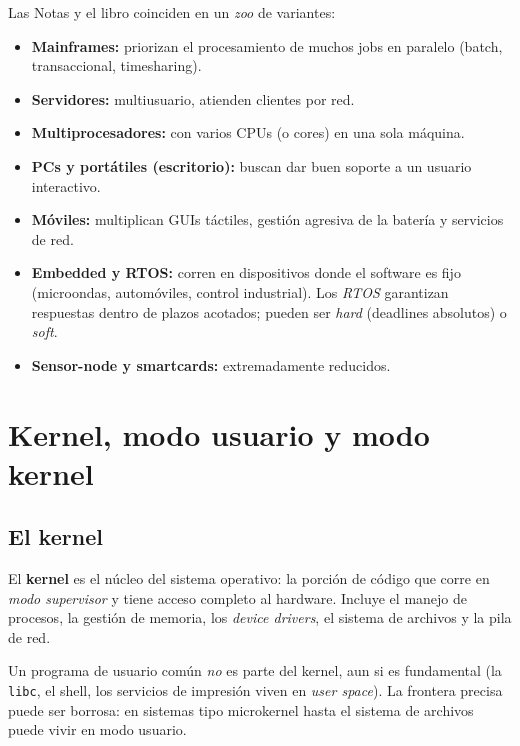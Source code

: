 \documentclass[11pt,a4paper]{article}
\begin{document}
Las Notas y el libro coinciden en un \emph{zoo} de variantes:

\begin{itemize}[leftmargin=*]
    \item \textbf{Mainframes:} priorizan el procesamiento de muchos jobs
        en paralelo (batch, transaccional, timesharing).
    \item \textbf{Servidores:} multiusuario, atienden clientes por red.
    \item \textbf{Multiprocesadores:} con varios CPUs (o cores) en una
        sola máquina.
    \item \textbf{PCs y portátiles (escritorio):} buscan dar buen
        soporte a un usuario interactivo.
    \item \textbf{Móviles:} multiplican GUIs táctiles, gestión agresiva
        de la batería y servicios de red.
    \item \textbf{Embedded y RTOS:} corren en dispositivos donde el
        software es fijo (microondas, automóviles, control industrial).
        Los \emph{RTOS} garantizan respuestas dentro de plazos
        acotados; pueden ser \emph{hard} (deadlines absolutos) o
        \emph{soft}.
    \item \textbf{Sensor-node y smartcards:} extremadamente reducidos.
\end{itemize}

\section{Kernel, modo usuario y modo kernel}

\subsection{El kernel}

\begin{definicion}
El \textbf{kernel} es el núcleo del sistema operativo: la porción de
código que corre en \emph{modo supervisor} y tiene acceso completo al
hardware. Incluye el manejo de procesos, la gestión de memoria, los
\emph{device drivers}, el sistema de archivos y la pila de red.
\end{definicion}

Un programa de usuario común \emph{no} es parte del kernel, aun si es
fundamental (la \texttt{libc}, el shell, los servicios de impresión
viven en \emph{user space}). La frontera precisa puede ser borrosa: en
sistemas tipo microkernel hasta el sistema de archivos puede vivir en
modo usuario.
\end{document}

